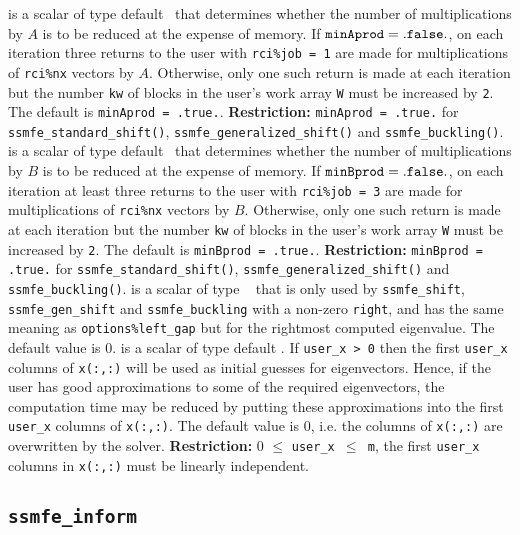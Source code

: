 \begin{description}
%
 is a scalar of type default \Logical\ that
determines whether the number of multiplications by $A$ 
is to be reduced at the expense of memory. 
If ${\tt minAprod = .false.}$, 
on each iteration three returns to the user
with {\tt rci\%job = 1} are
made for multiplications of {\tt rci\%nx} vectors by $A$.
Otherwise,  only one such return is made at each iteration but 
the number {\tt kw} of blocks in the user's work array {\tt W} 
must be increased by {\tt 2}.
The default is {\tt minAprod = .true.}.
{\bf Restriction:} {\tt minAprod = .true.} %
for {\tt ssmfe\_standard\_shift()}, {\tt ssmfe\_generalized\_shift()}
and  {\tt ssmfe\_buckling()}.
%
 is a scalar of type default \Logical\ that
determines whether the number of multiplications by $B$ 
is to be reduced at the expense of memory. 
If ${\tt minBprod = .false.}$, 
on each iteration at least three returns to the user
with {\tt rci\%job = 3} are
made for multiplications of {\tt rci\%nx} vectors by $B$.
Otherwise,  only one such return is made at each iteration but 
the number {\tt kw} of blocks in the user's work array {\tt W} 
must be increased by {\tt 2}.
The default is {\tt minBprod = .true.}.
{\bf Restriction:} {\tt minBprod = .true.} %
for {\tt ssmfe\_standard\_shift()}, {\tt ssmfe\_generalized\_shift()}
and  {\tt ssmfe\_buckling()}.
%
is a scalar of type \REALDP\ %
that is only used by 
{\tt ssmfe\_shift}, {\tt ssmfe\_gen\_shift}
and {\tt ssmfe\_buckling}
with a non-zero {\tt right}, and
has the same meaning as {\tt options\%left\_gap}
but for the rightmost computed eigenvalue.
The default value is 0.
%
 is a scalar of type default \Integer. 
If {\tt user\_x > 0} then the first {\tt user\_x} columns
of {\tt x(:,:)} will be used as initial guesses for eigenvectors.
Hence, if the user has good approximations
to some of the required eigenvectors, the computation time
may be reduced by putting these approximations
into the first {\tt user\_x} columns of {\tt x(:,:)}.
The default value is 0, 
i.e. the columns of {\tt x(:,:)} are overwritten by the solver.
{\bf Restriction:} {0 $\le$ \tt user\_x $\le$ m},
the first {\tt user\_x} columns in {\tt x(:,:)}
must be linearly independent.
%
\end{description}

\subsection{\texttt{ssmfe\_inform}}


